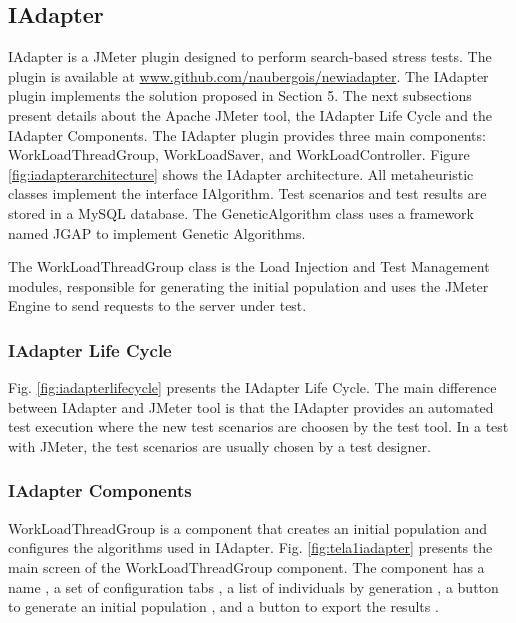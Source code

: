 \documentclass{bmcart}
\begin{document}
\subsection{IAdapter}

IAdapter is a JMeter plugin designed to perform search-based stress tests.  The plugin is available at \url{www.github.com/naubergois/newiadapter}.  The IAdapter plugin implements the solution proposed in Section 5. The next subsections present details about the Apache JMeter tool, the IAdapter Life Cycle and the IAdapter Components. The IAdapter plugin provides three main components: WorkLoadThreadGroup, WorkLoadSaver, and WorkLoadController. Figure \ref{fig:iadapterarchitecture} shows the IAdapter architecture. All metaheuristic classes implement the interface IAlgorithm. Test scenarios  and test results are stored in a MySQL database. The GeneticAlgorithm class uses a framework named JGAP to implement Genetic Algorithms.

The WorkLoadThreadGroup class is the Load Injection and Test Management modules, responsible for generating the initial population and uses the JMeter Engine to send requests to the server under test. 

\subsubsection{IAdapter Life Cycle}
 
Fig. \ref{fig:iadapterlifecycle} presents the IAdapter Life Cycle. The main difference between IAdapter and JMeter tool is that the IAdapter provides an automated test execution where the new test scenarios are choosen by the test tool.  In a test with JMeter, the test scenarios are usually chosen by a test designer.



\subsubsection{IAdapter Components}
 
WorkLoadThreadGroup is a component that creates an initial population and configures the algorithms used in IAdapter. Fig. \ref{fig:tela1iadapter} presents the main screen of the WorkLoadThreadGroup component. The component has a name , a set of configuration tabs , a list of individuals by generation , a button to generate an initial population , and a button to export the results .
\end{document}
